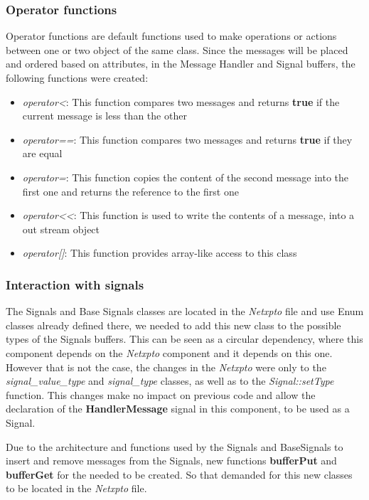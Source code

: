 \begin{refsection}
\subsubsection{Operator functions}
Operator functions are default functions used to make operations or actions
between one or two object of the same class. Since the messages will be placed
and ordered based on attributes, in the Message Handler and Signal buffers, 
the following functions were created:
\begin{itemize}
	\item \textit{operator<}: This function compares two messages and returns 
		\textbf{true} if the current message is less than the other
	\item \textit{operator==}: This function compares two messages and returns 
		\textbf{true} if they are equal
	\item \textit{operator=}: This function copies the content of the second
		message into the first one and returns the reference to the first one
	\item \textit{operator<<}: This function is used to write the contents of 
		a message, into a out stream object
	\item \textit{operator[]}: This function provides array-like access to this
		class
\end{itemize}

\subsubsection{Interaction with signals}
The Signals and Base Signals classes are located in the \textit{Netxpto} file 
and use Enum classes already defined there, we needed to add this new class
to the possible types of the Signals buffers. This can be seen as a 
circular dependency, where this component depends on the \textit{Netxpto} 
component and it depends on this one. However that is not the case, the 
changes in the \textit{Netxpto} were only to the \textit{signal\_value\_type}
and \textit{signal\_type} classes, as well as to the \textit{Signal::setType}
function. This changes make no impact on previous code and allow the 
declaration of the \textbf{HandlerMessage} signal in this component, to be used
as a Signal.

Due to the architecture and functions used by the Signals and BaseSignals to 
insert and remove messages from the Signals, new functions \textbf{bufferPut} 
and \textbf{bufferGet} for the  needed to be created.
So that demanded for this new classes to be located in the \textit{Netxpto} file.


\end{refsection}
